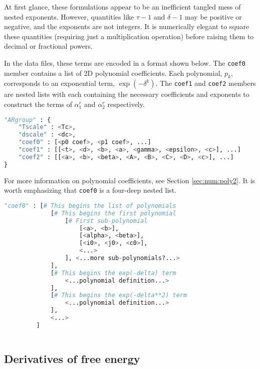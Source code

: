 At first glance, these formulations appear to be an inefficient tangled mess of nested exponents.  However, quantities like $\tau-1$ and $\delta-1$ may be positive or negative, and the exponents are not integers.  It is numerically elegant to square these quantities (requiring just a multiplication operation) before raising them to decimal or fractional powers.

In the data files, these terms are encoded in a format shown below.  The \texttt{coef0} member contains a list of 2D polynomial coefficients.  Each polynomial, $p_k$, corresponds to an exponential term, $\exp(-\delta^k)$.  The \texttt{coef1} and \texttt{coef2} members are nested lists with each containing the necessary coefficients and exponents to construct the terms of $\alpha^r_1$ and $\alpha^r_2$ respectively.  
\begin{lstlisting}[language=Python]
"ARgroup" : {
    "Tscale" : <Tc>,
    "dscale" : <dc>,
    "coef0" : [<p0 coef>, <p1 coef>, ...]
    "coef1" : [[<t>, <d>, <b>, <a>, <gamma>, <epsilon>, <c>], ...]
    "coef2" : [[<a>, <b>, <beta>, <A>, <B>, <C>, <D>, <c>], ...]
}
\end{lstlisting}

For more information on polynomial coefficients, see Section \ref{sec:num:poly2}.  It is worth emphasizing that \texttt{coef0} is a four-deep nested list.
\begin{lstlisting}[language=Python]
"coef0" : [# This begins the list of polynomials
             [# This begins the first polynomial
                 [# First sub-polynomial
                     [<a>, <b>],
                     [<alpha>, <beta>],
                     [<i0>, <j0>, <c0>],
                     <...>
                 ], <...more sub-polynomials?...>
             ],
             [# This begins the exp(-delta) term
                 <...polynomial definition...>
             ],
             [# This begins the exp(-delta**2) term
                 <...polynomial definition...>
             ],
             <...>
         ]
             
\end{lstlisting}

\subsection{Derivatives of free energy}

